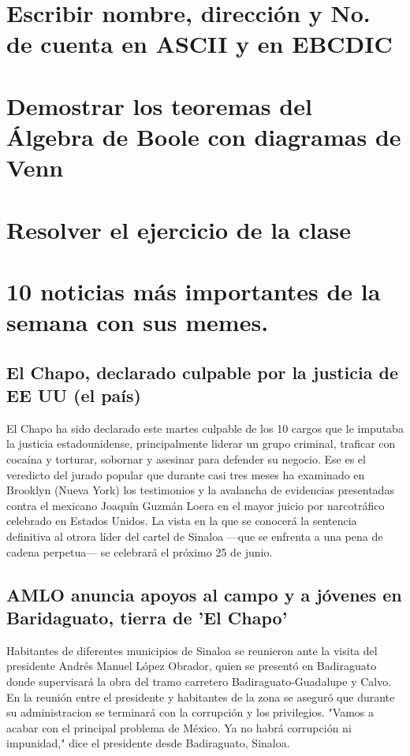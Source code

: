 \documentclass{mylib/reporte}
\begin{document}
\section{Escribir nombre, dirección y No. de cuenta en ASCII y en EBCDIC}
\section{Demostrar los teoremas del Álgebra de Boole con diagramas de Venn}
\section{Resolver el ejercicio de la clase}

\section{10 noticias más importantes de la semana con sus memes.}

\subsection{El Chapo, declarado culpable por la justicia de EE UU (el país)}

El Chapo ha sido declarado este martes culpable de los 10 cargos que le imputaba la justicia estadounidense, principalmente liderar un grupo criminal, traficar con cocaína y torturar, sobornar y asesinar para defender su negocio. Ese es el veredicto del jurado popular que durante casi tres meses ha examinado en Brooklyn (Nueva York) los testimonios y la avalancha de evidencias presentadas contra el mexicano Joaquín Guzmán Loera en el mayor juicio por narcotráfico celebrado en Estados Unidos. La vista en la que se conocerá la sentencia definitiva al otrora líder del cartel de Sinaloa —que se enfrenta a una pena de cadena perpetua— se celebrará el próximo 25 de junio.

\subsection{AMLO anuncia apoyos al campo y a jóvenes en Baridaguato, tierra de 'El Chapo'}
Habitantes de diferentes municipios de Sinaloa se reunieron ante la visita del presidente Andrés Manuel López Obrador, quien se presentó en Badiraguato donde supervisará la obra del tramo carretero Badiraguato-Guadalupe y Calvo.
En la reunión entre el presidente y habitantes de la zona se aseguró que durante su administracion se terminará con la corrupción y los privilegios.
"Vamos a acabar con el principal problema de México. Ya no habrá corrupción ni impunidad," dice el presidente desde Badiraguato, Sinaloa.
\end{document}
